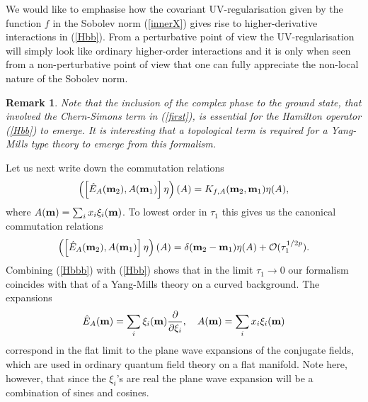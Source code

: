 \documentclass[letterpaper,11pt]{article}
\def\d{\delta}
\def\co{{\cal O}}
\newcommand{\pa}{\partial}
\newtheorem{remark}{Remark}
\begin{document}
We would like to emphasise how the covariant UV-regularisation given by the function $f$ in the Sobolev norm (\ref{innerX}) gives rise to higher-derivative interactions in (\ref{Hbb}). From a perturbative point of view the UV-regularisation will simply look like ordinary higher-order interactions and it is only when seen from a non-perturbative point of view that one can fully appreciate the non-local nature of the Sobolev norm.






\begin{remark}
Note that the inclusion of the complex phase to the ground state, that involved the Chern-Simons term in (\ref{first}), is essential for the Hamilton operator (\ref{Hbb}) to emerge. It is interesting that a topological term is required for a Yang-Mills type theory to emerge from this formalism. 
\end{remark}






Let us next write down the commutation relations
$$
\left( \left[ \hat{E}_A({\bf m}_2),{A}({\bf m}_1) \right] \eta\right)(A)  = K_{f,A}({\bf m}_2,{\bf m}_1) \eta(A),
$$
where $A({\bf m})=\sum_i x_i \xi_i({\bf m})$. To lowest order in $\tau_1$ this gives us the canonical commutation relations
\begin{equation}
\left( \left[ \hat{E}_A ({\bf m}_2),{A}({\bf m}_1) \right]\eta\right)(A)  = \d({\bf m}_2-{\bf m}_1) \eta(A) + \co(\tau_1^{{1/2p}}).
\label{Hbbb}
\end{equation} 
Combining (\ref{Hbbb}) with (\ref{Hbb}) shows that in the limit $\tau_1\rightarrow 0$ our formalism coincides with that of a Yang-Mills theory on a curved background. The expansions 
$$
\hat{E}_A ({\bf m})=\sum_i \xi_i({\bf m})\frac{\pa}{\pa \xi_i},\quad A({\bf m})=\sum_i x_i \xi_i({\bf m})
$$ 
correspond in the flat limit to the plane wave expansions of the conjugate fields, which are used in ordinary quantum field theory on a flat manifold. Note here, however, that since the $\xi_i$'s are real the plane wave expansion will be a combination of sines and cosines.  
\end{document}
